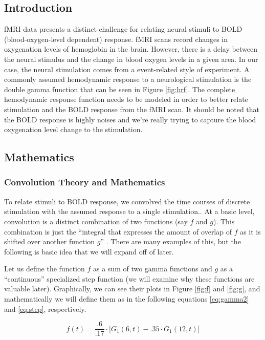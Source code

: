 
\subsection{Introduction}

fMRI data presents a distinct challenge for relating neural stimuli 
to BOLD (blood-oxygen-level dependent) response. fMRI scans record changes 
in oxygenation levels of hemoglobin in the brain. However, there is a delay 
between the neural stimulus and the change in blood oxygen levels in a given 
area. In our case, the neural stimulation comes from a event-related style of 
experiment. A commonly assumed hemodynamic response to a neurological 
stimulation is the double gamma function that can be seen in Figure 
\ref{fig:hrf}. The complete hemodynamic response function needs to be modeled 
in order to better relate stimulation and the BOLD response from the fMRI scan.
It should be noted that the BOLD response is highly noises and we're really 
trying to capture the blood oxygenation level change to the stimulation.

\subsection{Mathematics}
\subsubsection{Convolution Theory and Mathematics}

To relate stimuli to BOLD response, we convolved the time courses of discrete 
stimulation with the assumed response to a single stimulation.. At a basic 
level, convolution is a distinct combination of two functions (say $f$ and 
$g$). This combination is just the ``integral that expresses the amount of 
overlap of $f$ as it is shifted over another function $g$'' 
\cite{weissten2015convolution}. 
There are many examples of this, but the following is basic idea that we will 
expand off of later. 

Let us define the function $f$ as a sum of two gamma functions and $g$ as a 
``continuous'' specialized step function (we will examine why these functions 
are valuable later). Graphically, we can see their plots in Figure \ref{fig:f}
and \ref{fig:g}, and mathematically we will define them as in the following 
equations \ref{eq:gamma2} and \ref{eq:step}, respectively.

\begin{equation} \label{eq:gamma2}
f(t)=\frac{.6}{.17}\cdot  \big[G_1(6,t)-.35 \cdot G_1(12,t) \big]
\end{equation}

